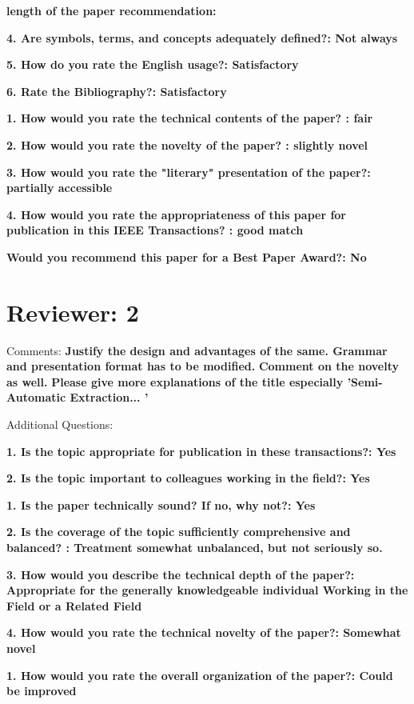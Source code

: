 \documentclass[12pt]{article}
\begin{document}
\textbf{length of the paper recommendation:}

\textbf{4. Are symbols, terms, and concepts adequately defined?: Not always}

\textbf{5. How do you rate the English usage?: Satisfactory}

\textbf{6. Rate the Bibliography?: Satisfactory}

\textbf{1. How would you rate the technical contents of the paper? : fair}

\textbf{2. How would you rate the novelty of the paper? : slightly novel}

\textbf{3. How would you rate the "literary" presentation of the paper?: partially accessible}

\textbf{4. How would you rate the appropriateness of this paper for publication in this IEEE Transactions? : good match}

\textbf{Would you recommend this paper for a Best Paper Award?: No}


\section*{Reviewer: 2}

Comments:
\textbf{Justify the design and advantages of the same. Grammar and presentation format has to be modified.}
\textbf{Comment on the novelty as well.}
\textbf{Please give more explanations of the title especially 'Semi-Automatic Extraction... '}

Additional Questions:

\textbf{1. Is the topic appropriate for publication in these transactions?: Yes}

\textbf{2. Is the topic important to colleagues working in the field?: Yes}

\textbf{1. Is the paper technically sound? If no, why not?: Yes}


\textbf{2. Is the coverage of the topic sufficiently comprehensive and balanced? : Treatment somewhat unbalanced, but not seriously so.}

\textbf{3. How would you describe the technical depth of the paper?: Appropriate for the generally knowledgeable individual Working in the Field or a Related Field}

\textbf{4. How would you rate the technical novelty of the paper?: Somewhat novel}

\textbf{1. How would you rate the overall organization of the paper?: Could be improved}
\end{document}
